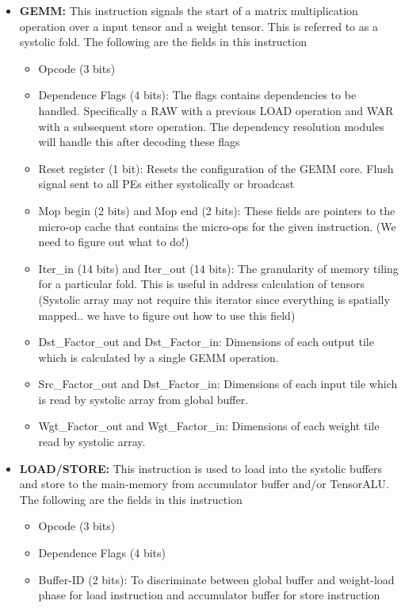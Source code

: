 \begin{itemize}
    \item \textbf{GEMM:} This instruction signals the start of a matrix multiplication operation over a input tensor and a weight tensor. This is referred to as a systolic fold. The following are the fields in this instruction
    \begin{itemize}
        \item Opcode (3 bits)
        \item Dependence Flags (4 bits): The flags contains dependencies to be handled. Specifically a RAW with a previous LOAD operation and WAR with a subsequent store operation. The dependency resolution modules will handle this after decoding these flags
        \item Reset register (1 bit): Resets the configuration of the GEMM core. Flush signal sent to all PEs either systolically or broadcast 
        \item Mop begin (2 bits) and Mop end (2 bits): These fields are pointers to the micro-op cache that contains the micro-ops for the given instruction. (We need to figure out what to do!)
        \item Iter\_in (14 bits) and Iter\_out (14 bits): The granularity of memory tiling for a particular fold. This is useful in address calculation of tensors (Systolic array may not require this iterator since everything is spatially mapped.. we have to figure out how to use this field)
        \item Dst\_Factor\_out and Dst\_Factor\_in: Dimensions of each output tile which is calculated by a single GEMM operation. 
        \item Src\_Factor\_out and Dst\_Factor\_in: Dimensions of each input tile which is read by systolic array from global buffer. 
        \item Wgt\_Factor\_out and Wgt\_Factor\_in: Dimensions of each weight tile read by systolic array.
    \end{itemize}
    \item \textbf{LOAD/STORE:} This instruction is used to load into the systolic buffers and store to the main-memory from accumulator buffer and/or TensorALU. The following are the fields in this instruction
    \begin{itemize}
        \item Opcode (3 bits)
        \item Dependence Flags (4 bits)
        \item Buffer-ID (2 bits): To discriminate between global buffer and weight-load phase for load instruction and accumulator buffer for store instruction

\end{itemize}
\end{itemize}
